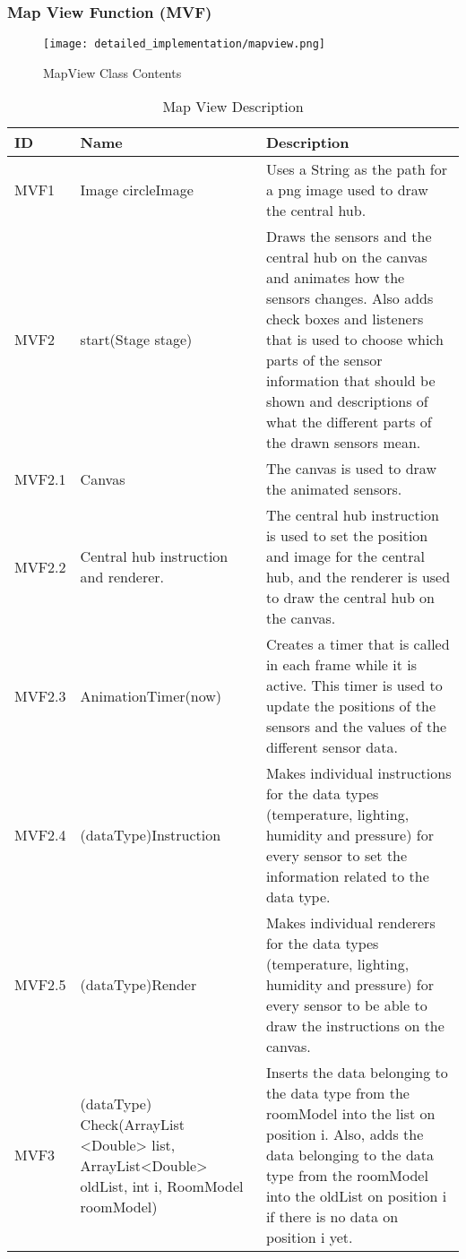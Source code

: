 \documentclass[../document]{subfiles}
\begin{document}
\subsubsection{Map View Function (MVF)}

\begin{figure}[H]
\centering
\texttt{[image: detailed\_implementation/mapview.png]}
\caption{MapView Class Contents}
\end{figure}

\begin{table}[H]
\caption{Map View Description}
\centering
\begin{tabularx}{\textwidth}{|l|L{3.5cm}|X|}
	\hline
	ID
	&Name
	&Description
	\\ \hline MVF1
	&Image circleImage
	&Uses a String as the path for a png image used to draw the central hub.
	\\ \hline MVF2
	&start(Stage stage)
	&Draws the sensors and the central hub on the canvas and animates how the sensors changes. Also adds check boxes and listeners that is used to choose which parts of the sensor information that should be shown and descriptions of what the different parts of the drawn sensors mean.  
	\\ \hline MVF2.1
	&Canvas
	&The canvas is used to draw the animated sensors.
	\\ \hline MVF2.2
	&Central hub instruction and renderer.
	&The central hub instruction is used to set the position and image for the central hub, and the renderer is used to draw the central hub on the canvas.
	\\ \hline MVF2.3
	&AnimationTimer(now)
	&Creates a timer that is called in each frame while it is active. This timer is used to update the positions of the sensors and the values of the different sensor data.
	\\ \hline MVF2.4
	&(dataType)Instruction
	&Makes individual instructions for the data types (temperature, lighting, humidity and pressure) for every sensor to set the information related to the data type.
	\\ \hline MVF2.5
	&(dataType)Render
	&Makes individual renderers for the data types (temperature, lighting, humidity and pressure) for every sensor to be able to draw the instructions on the canvas.
	\\ \hline MVF3
	&(dataType) Check(ArrayList <Double> list, ArrayList<Double> oldList, int i, RoomModel roomModel)
	&Inserts the data belonging to the data type from the roomModel into the list on position i. Also, adds the data belonging to the data type from the roomModel into the oldList on position i if there is no data on position i yet.
	\\ \hline 
\end{tabularx}
\end{table}
\end{document}
